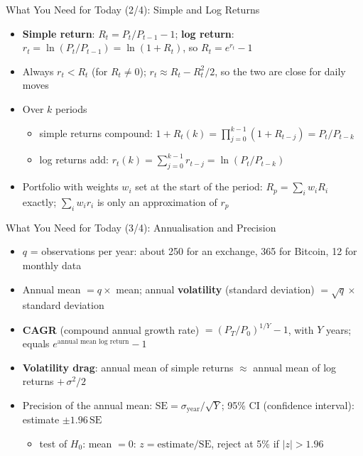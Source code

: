 \begin{frame}{What You Need for Today (2/4): Simple and Log Returns}
\itemsize{\small}
\begin{itemize}
    \item \textbf{Simple return}: $R_t = P_t/P_{t-1} - 1$; \textbf{log return}: $r_t = \ln(P_t/P_{t-1}) = \ln(1 + R_t)$, so $R_t = e^{r_t} - 1$
    \item Always $r_t < R_t$ (for $R_t \neq 0$); $r_t \approx R_t - R_t^2/2$, so the two are close for daily moves
    \item Over $k$ periods
    \begin{itemize}
        \item simple returns compound: $1 + R_t(k) = \prod_{j=0}^{k-1}(1 + R_{t-j}) = P_t/P_{t-k}$
        \item log returns add: $r_t(k) = \sum_{j=0}^{k-1} r_{t-j} = \ln(P_t/P_{t-k})$
    \end{itemize}
    \item Portfolio with weights $w_i$ set at the start of the period: $R_p = \sum_i w_i R_i$ exactly; $\sum_i w_i r_i$ is only an approximation of $r_p$
\end{itemize}
\end{frame}

\begin{frame}{What You Need for Today (3/4): Annualisation and Precision}
\itemsize{\footnotesize}
\begin{itemize}
    \item $q$ = observations per year: about 250 for an exchange, 365 for Bitcoin, 12 for monthly data
    \item Annual mean $= q \times$ mean; annual \textbf{volatility} (standard deviation) $= \sqrt{q} \times$ standard deviation
    \item \textbf{CAGR} (compound annual growth rate) $= (P_T/P_0)^{1/Y} - 1$, with $Y$ years; equals $e^{\text{annual mean log return}} - 1$
    \item \textbf{Volatility drag}: annual mean of simple returns $\approx$ annual mean of log returns $+\, \sigma^2/2$
    \item Precision of the annual mean: $\text{SE} = \sigma_{\text{year}}/\sqrt{Y}$; 95\% CI (confidence interval): estimate $\pm 1.96\,\text{SE}$
    \begin{itemize}
        \item test of $H_0$: mean $= 0$: $z = \text{estimate}/\text{SE}$, reject at 5\% if $|z| > 1.96$
    \end{itemize}
\end{itemize}
\end{frame}

